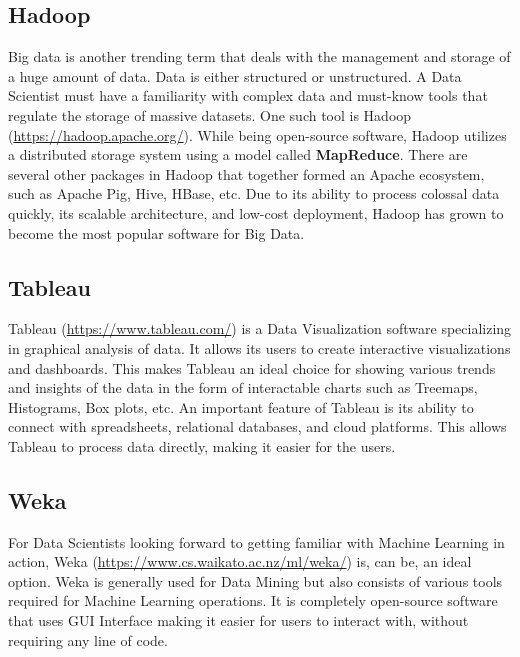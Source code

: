 \documentclass[
]{book}
\begin{document}
\hypertarget{hadoop}{%
\subsection*{Hadoop}\label{hadoop}}


Big data is another trending term that deals with the management and storage of a huge amount of data. Data is either structured or unstructured. A Data Scientist must have a familiarity with complex data and must-know tools that regulate the storage of massive datasets. One such tool is Hadoop (\url{https://hadoop.apache.org/}). While being open-source software, Hadoop utilizes a distributed storage system using a model called \textbf{MapReduce}. There are several other packages in Hadoop that together formed an Apache ecosystem, such as Apache Pig, Hive, HBase, etc. Due to its ability to process colossal data quickly, its scalable architecture, and low-cost deployment, Hadoop has grown to become the most popular software for Big Data.

\hypertarget{tableau}{%
\subsection*{Tableau}\label{tableau}}


Tableau (\url{https://www.tableau.com/}) is a Data Visualization software specializing in graphical analysis of data. It allows its users to create interactive visualizations and dashboards. This makes Tableau an ideal choice for showing various trends and insights of the data in the form of interactable charts such as Treemaps, Histograms, Box plots, etc. An important feature of Tableau is its ability to connect with spreadsheets, relational databases, and cloud platforms. This allows Tableau to process data directly, making it easier for the users.

\hypertarget{weka}{%
\subsection*{Weka}\label{weka}}


For Data Scientists looking forward to getting familiar with Machine Learning in action, Weka (\url{https://www.cs.waikato.ac.nz/ml/weka/}) is, can be, an ideal option. Weka is generally used for Data Mining but also consists of various tools required for Machine Learning operations. It is completely open-source software that uses GUI Interface making it easier for users to interact with, without requiring any line of code.
\end{document}
